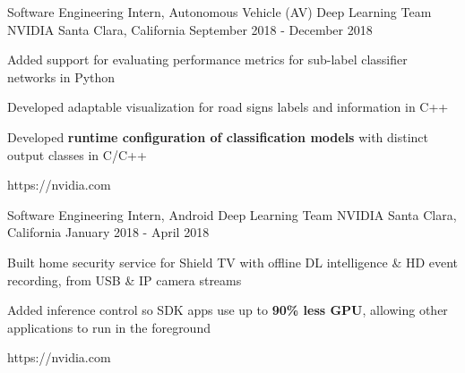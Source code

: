 


\begin{cventries}


\cventrylink
{Software Engineering Intern, Autonomous Vehicle (AV) Deep Learning Team}
{NVIDIA}
{Santa Clara, California}
{September 2018 - December 2018}
{ %
\begin{cvitems}
\item{Added support for evaluating performance metrics for sub-label classifier networks in Python}
\item{Developed adaptable visualization for road signs labels and information in C++}
\item{Developed \textbf{runtime configuration of classification models} with distinct output classes in C/C++}
\end{cvitems}
}
{https://nvidia.com}


\cventrylink
{Software Engineering Intern, Android Deep Learning Team}
{NVIDIA}
{Santa Clara, California}
{January 2018 - April 2018}
{ %
\begin{cvitems}
\item{Built home security service for Shield TV with offline DL intelligence \& HD event recording, from USB \& IP camera streams}
\item{Added inference control so SDK apps use up to \textbf{90\% less GPU}, allowing other applications to run in the foreground}
\end{cvitems}
}
{https://nvidia.com}



\end{cventries}
